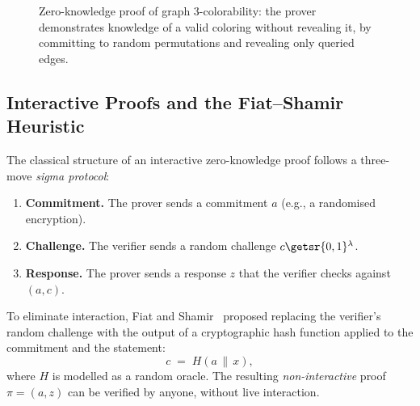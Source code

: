 \begin{figure}[t]
\centering
{}
\caption{Zero-knowledge proof of graph 3-colorability: the prover demonstrates knowledge of a valid coloring without revealing it, by committing to random permutations and revealing only queried edges.}
\label{fig:ch14-zk-coloring}
\end{figure}


\subsection{Interactive Proofs and the Fiat--Shamir Heuristic}
\label{subsec:fiat-shamir}

The classical structure of an interactive zero-knowledge proof follows a three-move \emph{sigma protocol}:

\begin{enumerate}
\item \textbf{Commitment.} The prover sends a commitment $a$ (e.g., a randomised encryption).
\item \textbf{Challenge.} The verifier sends a random challenge $c \getsr \{0,1\}^\lambda$.
\item \textbf{Response.} The prover sends a response $z$ that the verifier checks against $(a, c)$.
\end{enumerate}

To eliminate interaction, Fiat and Shamir~\cite{FiatShamir1986} proposed replacing the verifier's random challenge with the output of a cryptographic hash function applied to the commitment and the statement:
\begin{equation}
\label{eq:fiat-shamir}
c \;=\; H(a \,\|\, x),
\end{equation}
where $H$ is modelled as a random oracle.  The resulting \emph{non-interactive} proof $\pi = (a, z)$ can be verified by anyone, without live interaction.

